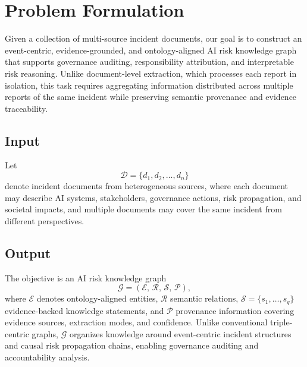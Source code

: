 \documentclass[a4paper,fleqn]{cas-dc}
\begin{document}

\section{Problem Formulation}
\label{sec:formulation}

Given a collection of multi-source incident documents, our goal is to
construct an event-centric, evidence-grounded, and ontology-aligned AI
risk knowledge graph that supports governance auditing,
responsibility attribution, and interpretable risk reasoning.
Unlike document-level extraction, which processes each report in
isolation, this task requires aggregating information distributed
across multiple reports of the same incident while preserving
semantic provenance and evidence traceability.

\subsection{Input}

Let
\begin{equation}
  \mathcal{D} = \{d_1, d_2, \ldots, d_n\}
\end{equation}
denote incident documents from heterogeneous sources, where each
document may describe AI systems, stakeholders, governance actions,
risk propagation, and societal impacts, and multiple documents may
cover the same incident from different perspectives.

\subsection{Output}

The objective is an AI risk knowledge graph
\begin{equation}
  \mathcal{G} = (\mathcal{E},\, \mathcal{R},\, \mathcal{S},\,
                 \mathcal{P}),
\end{equation}
where $\mathcal{E}$ denotes ontology-aligned entities,
$\mathcal{R}$ semantic relations, $\mathcal{S}=\{s_1,\ldots,s_q\}$
evidence-backed knowledge statements, and $\mathcal{P}$ provenance
information covering evidence sources, extraction modes, and
confidence.
Unlike conventional triple-centric graphs, $\mathcal{G}$ organizes
knowledge around event-centric incident structures and causal risk
propagation chains, enabling governance auditing and accountability
analysis.
\end{document}
